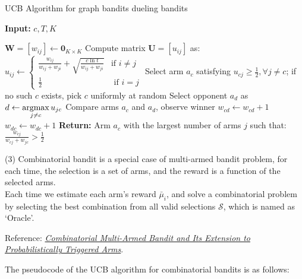 \vspace{-0.3cm}
\begin{algorithm}[h]
    \caption{UCB Algorithm for graph bandits dueling bandits}
    \textbf{Input:} $c, T, K$
    \begin{algorithmic}[1]
    \State $\mathbf{W} = [w_{ij}] \gets \mathbf{0}_{K \times K}$ 
        \State Compute matrix $\mathbf{U} = [u_{ij}]$ as: $u_{ij} \gets \begin{cases}
        \frac{w_{ij}}{w_{ij} + w_{ji}} + \sqrt{\frac{c \ln t}{w_{ij} + w_{ji}}} & \text{if } i \neq j \\
        \frac{1}{2} & \text{ if } i = j
        \end{cases}$
        \State Select arm $a_c$ satisfying $u_{cj} \ge \frac{1}{2}, \forall j \neq c$; if no such $c$ exists, pick $c$ uniformly at random
        \State Select opponent $a_d$ as $d \gets \mathop{\rm argmax}\limits_{j \neq c} u_{jc}$ 
        \State Compare arms $a_c$ and $a_d$, observe winner
            \State $w_{cd} \gets w_{cd} + 1$
        \Else
            \State $w_{dc} \gets w_{dc} + 1$
        \EndIf
    \EndFor
    \State \textbf{Return:} Arm $a_c$ with the largest number of arms $j$ such that: $\frac{w_{cj}}{w_{cj} + w_{jc}} > \frac{1}{2}$
    \end{algorithmic}
\end{algorithm}
\vspace{-0.5cm}

(3) Combinatorial bandit is a special case of multi-armed bandit problem, for each time, the selection is a set of arms, and the reward is a function of the selected arms. \\
Each time we estimate each arm's reward $\bar{\mu}_i$, and solve a combinatorial problem by selecting the best combination from all valid selections $\mathcal{S}$, which is named as `Oracle'.

Reference: \href{https://arxiv.org/abs/1407.8339}{\textit{Combinatorial Multi-Armed Bandit and Its Extension to Probabilistically Triggered Arms}}.

The pseudocode of the UCB algorithm for combinatorial bandits is as follows:

